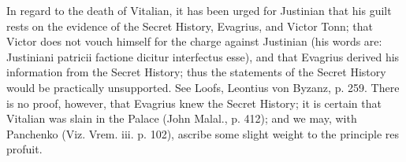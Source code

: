 In regard to the death of Vitalian, it has been urged for Justinian that his guilt rests on the evidence of the Secret History, Evagrius, and Victor Tonn; that Victor does not vouch himself for the charge against Justinian (his words are: Justiniani patricii factione dicitur interfectus esse), and that Evagrius derived his information from the Secret History; thus the statements of the Secret History would be practically unsupported. See Loofs, Leontius von Byzanz, p. 259. There is no proof, however, that Evagrius knew the Secret History; it is certain that Vitalian was slain in the Palace (John Malal., p. 412); and we may, with Panchenko (Viz. Vrem. iii. p. 102), ascribe some slight weight to the principle res profuit.


